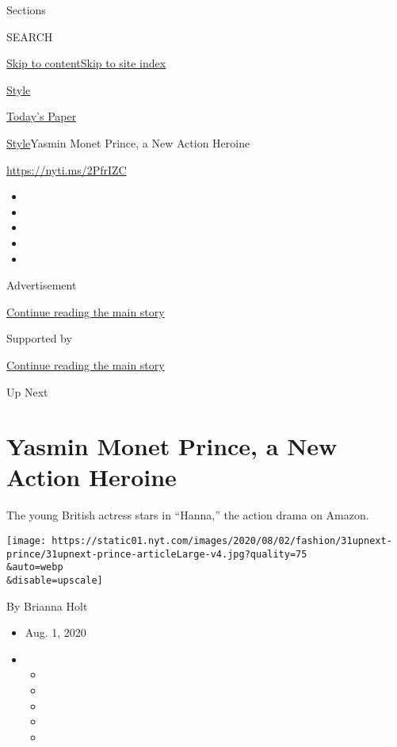 Sections

SEARCH

\protect\hyperlink{site-content}{Skip to
content}\protect\hyperlink{site-index}{Skip to site index}

\href{https://www.nytimes.com/section/style}{Style}

\href{https://myaccount.nytimes.com/auth/login?response_type=cookie\&client_id=vi}{}

\href{https://www.nytimes.com/section/todayspaper}{Today's Paper}

\href{/section/style}{Style}\textbar{}Yasmin Monet Prince, a New Action
Heroine

\url{https://nyti.ms/2PfrIZC}

\begin{itemize}
\item
\item
\item
\item
\item
\end{itemize}

Advertisement

\protect\hyperlink{after-top}{Continue reading the main story}

Supported by

\protect\hyperlink{after-sponsor}{Continue reading the main story}

Up Next

\hypertarget{yasmin-monet-prince-a-new-action-heroine}{%
\section{Yasmin Monet Prince, a New Action
Heroine}\label{yasmin-monet-prince-a-new-action-heroine}}

The young British actress stars in ``Hanna,'' the action drama on
Amazon.

\texttt{[image: https://static01.nyt.com/images/2020/08/02/fashion/31upnext-prince/31upnext-prince-articleLarge-v4.jpg?quality=75\\\&auto=webp\\\&disable=upscale]}

By Brianna Holt

\begin{itemize}
\item
  Aug. 1, 2020
\item
  \begin{itemize}
  \item
  \item
  \item
  \item
  \item
  \end{itemize}
\end{itemize}

